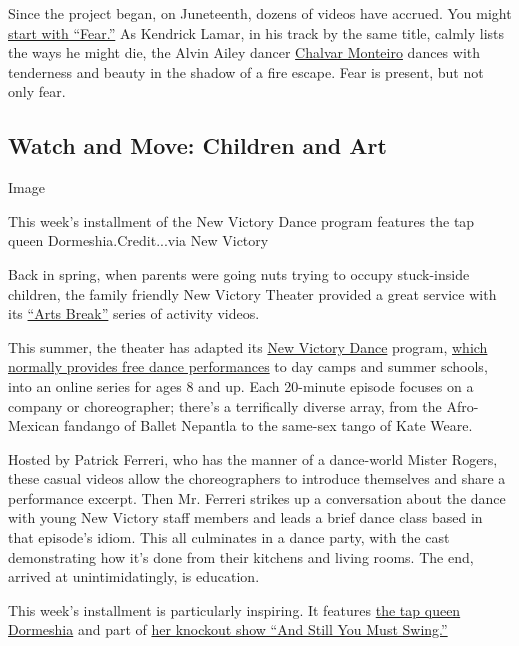 Since the project began, on Juneteenth, dozens of videos have accrued.
You might \href{https://www.instagram.com/p/CCmnTQMMm_g/}{start with
``Fear.''} As Kendrick Lamar, in his track by the same title, calmly
lists the ways he might die, the Alvin Ailey dancer
\href{https://www.dancemagazine.com/on-the-rise-chalvar-monteiro-2366853607.html}{Chalvar
Monteiro} dances with tenderness and beauty in the shadow of a fire
escape. Fear is present, but not only fear.

\hypertarget{watch-and-move-children-and-art}{%
\subsection{Watch and Move: Children and
Art}\label{watch-and-move-children-and-art}}

Image

This week's installment of the New Victory Dance program features the
tap queen Dormeshia.Credit...via New Victory

Back in spring, when parents were going nuts trying to occupy
stuck-inside children, the family friendly New Victory Theater provided
a great service with its
\href{https://newvictory.org/stories/category/family-engagement/new-victory-arts-break/}{``Arts
Break''} series of activity videos.

This summer, the theater has adapted its
\href{https://newvictory.org/virtual-events/new-victory-dance-2020/}{New
Victory Dance} program,
\href{https://www.nytimes3xbfgragh.onion/2014/07/31/arts/dance/dancing-and-hoping-to-win-fans-for-life.html?searchResultPosition=2}{which
normally provides free dance performances} to day camps and summer
schools, into an online series for ages 8 and up. Each 20-minute episode
focuses on a company or choreographer; there's a terrifically diverse
array, from the Afro-Mexican fandango of Ballet Nepantla to the same-sex
tango of Kate Weare.

Hosted by Patrick Ferreri, who has the manner of a dance-world Mister
Rogers, these casual videos allow the choreographers to introduce
themselves and share a performance excerpt. Then Mr. Ferreri strikes up
a conversation about the dance with young New Victory staff members and
leads a brief dance class based in that episode's idiom. This all
culminates in a dance party, with the cast demonstrating how it's done
from their kitchens and living rooms. The end, arrived at
unintimidatingly, is education.

This week's installment is particularly inspiring. It features
\href{https://www.nytimes3xbfgragh.onion/2019/11/22/arts/Dormeshia-tap-dancing.html?searchResultPosition=4}{the
tap queen Dormeshia} and part of
\href{https://www.nytimes3xbfgragh.onion/2019/12/04/arts/dance/dormeshia-and-still-you-must-swing-review.html?searchResultPosition=3}{her
knockout show ``And Still You Must Swing.''}

